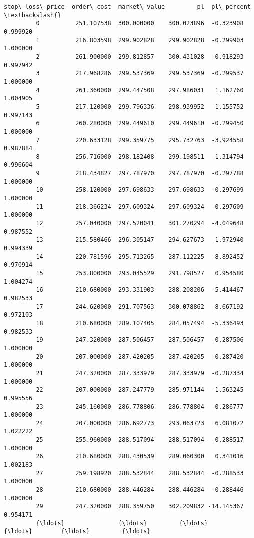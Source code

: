 \documentclass[11pt]{article}
\begin{document}
\begin{Verbatim}[commandchars=\\\{\}]
               stop\_loss\_price  order\_cost  market\_value         pl  pl\_percent  \textbackslash{}
         0          251.107538  300.000000    300.023896  -0.323908    0.999920   
         1          216.803598  299.902828    299.902828  -0.299903    1.000000   
         2          261.900000  299.812857    300.431028  -0.918293    0.997942   
         3          217.968286  299.537369    299.537369  -0.299537    1.000000   
         4          261.360000  299.447508    297.986031   1.162760    1.004905   
         5          217.120000  299.796336    298.939952  -1.155752    0.997143   
         6          260.280000  299.449610    299.449610  -0.299450    1.000000   
         7          220.633128  299.359775    295.732763  -3.924558    0.987884   
         8          256.716000  298.182408    299.198511  -1.314794    0.996604   
         9          218.434827  297.787970    297.787970  -0.297788    1.000000   
         10         258.120000  297.698633    297.698633  -0.297699    1.000000   
         11         218.366234  297.609324    297.609324  -0.297609    1.000000   
         12         257.040000  297.520041    301.270294  -4.049648    0.987552   
         13         215.580466  296.305147    294.627673  -1.972940    0.994339   
         14         220.781596  295.713265    287.112225  -8.892452    0.970914   
         15         253.800000  293.045529    291.798527   0.954580    1.004274   
         16         210.680000  293.331903    288.208206  -5.414467    0.982533   
         17         244.620000  291.707563    300.078862  -8.667192    0.972103   
         18         210.680000  289.107405    284.057494  -5.336493    0.982533   
         19         247.320000  287.506457    287.506457  -0.287506    1.000000   
         20         207.000000  287.420205    287.420205  -0.287420    1.000000   
         21         247.320000  287.333979    287.333979  -0.287334    1.000000   
         22         207.000000  287.247779    285.971144  -1.563245    0.995556   
         23         245.160000  286.778806    286.778804  -0.286777    1.000000   
         24         207.000000  286.692773    293.063723   6.081072    1.022222   
         25         255.960000  288.517094    288.517094  -0.288517    1.000000   
         26         210.680000  288.430539    289.060300   0.341016    1.002183   
         27         259.198920  288.532844    288.532844  -0.288533    1.000000   
         28         210.680000  288.446284    288.446284  -0.288446    1.000000   
         29         247.320000  288.359750    302.209832 -14.145367    0.954171   
         {\ldots}               {\ldots}         {\ldots}           {\ldots}        {\ldots}         {\ldots}   

\end{Verbatim}
\end{document}
